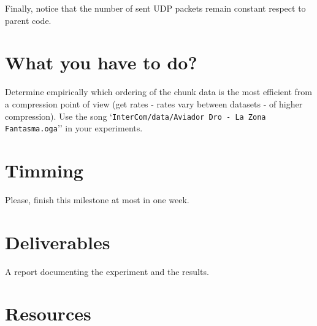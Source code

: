 Finally, notice that the number of sent UDP packets remain constant
respect to parent code.

\section{What you have to do?}

Determine empirically which ordering of the chunk data is the most
efficient from a compression point of view (get rates - rates vary
between datasets - of higher compression). Use the song
`\verb|InterCom/data/Aviador Dro - La Zona Fantasma.oga|'' in your
experiments.

\section{Timming}

Please, finish this milestone at most in one week.

\section{Deliverables}

A report documenting the experiment and the results.


\section{Resources}


